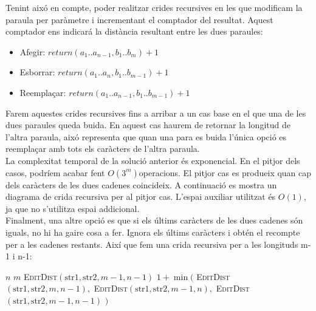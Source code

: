 \documentclass[conference]{IEEEtran}
\begin{document}
    Tenint aixó en compte, poder realitzar crides recursives en les que modificam la paraula per paràmetre i incrementant el comptador del resultat. Aquest comptador ens indicará la distància resultant entre les dues paraules:
    \begin{itemize}
        \item Afegir: $return  (a_1..a_{n-1}, b_1..b_m) + 1$
        \item Esborrar: $return (a_1..a_n, b_1..b_{m-1}) + 1$
        \item Reemplaçar: $return (a_1..a_{n-1}, b_1..b_{m-1}) + 1$
    \end{itemize}
    Farem aquestes crides recursives fins a arribar a un cas base en el que una de les dues paraules queda buida. En aquest cas haurem de retornar la longitud de l'altra paraula, aixó representa que quan una para es buida l'única opció es reemplaçar amb tots els caràcters de l'altra paraula.\\
    La complexitat temporal de la solució anterior és exponencial. En el pitjor dels casos, podríem acabar fent $O(3^m)$operacions. El pitjor cas es produeix quan cap dels caràcters de les dues cadenes coincideix. A continuació es mostra un diagrama de crida recursiva per al pitjor cas.
    L'espai auxiliar utilitzat és $O(1)$, ja que no s'utilitza espai addicional.\\
    Finalment, una altre opció es que si els últims caràcters de les dues cadenes són iguals, no hi ha gaire cosa a fer. Ignora els últims caràcters i obtén el recompte per a les cadenes restants. Així que fem una crida recursiva per a les longituds m-1 i n-1:
    \begin{algorithmic}
            \State \Return $n$
        \EndIf
            \State \Return $m$
        \EndIf
            \State \Return \textsc{EditDist}$(\textrm{str1}, \textrm{str2}, m - 1, n - 1)$
        \EndIf
        \State \Return $1 + \min($
        \State \hspace{2em} \textsc{EditDist}$(\textrm{str1}, \textrm{str2}, m, n - 1),$ 
        \State \hspace{2em} \textsc{EditDist}$(\textrm{str1}, \textrm{str2}, m - 1, n),$ 
        \State \hspace{2em} \textsc{EditDist}$(\textrm{str1}, \textrm{str2}, m - 1, n - 1)$ 
        \State $)$
        \EndFunction
    \end{algorithmic}
\end{document}
